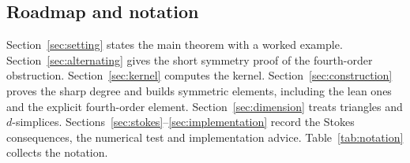 \documentclass[11pt,a4paper]{article}
\theoremstyle{definition}
\theoremstyle{remark}
\begin{document}
\subsection{Roadmap and notation}

Section~\ref{sec:setting} states the main theorem with a worked
example. Section~\ref{sec:alternating} gives the short symmetry proof
of the fourth-order obstruction. Section~\ref{sec:kernel} computes the
kernel. Section~\ref{sec:construction} proves the sharp degree and
builds symmetric elements, including the lean ones and the explicit
fourth-order element. Section~\ref{sec:dimension} treats triangles and
\(d\)-simplices. Sections~\ref{sec:stokes}--\ref{sec:implementation}
record the Stokes consequences, the numerical test and implementation
advice. Table~\ref{tab:notation} collects the notation.
\end{document}

